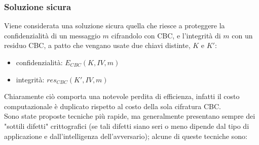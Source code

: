 \subsubsection{Soluzione sicura}
Viene considerata una soluzione sicura quella che riesce a proteggere la confidenzialità di un messaggio $m$ cifrandolo con CBC, e l'integrità di $m$ con un residuo CBC, a patto che vengano usate due chiavi distinte, $K$ e $K'$:
\begin{itemize}
\item confidenzialità: $E_{CBC}(K, IV, m)$
\item integrità: $res_{CBC}(K', IV, m)$
\end{itemize}
Chiaramente ciò comporta una notevole perdita di efficienza, infatti il costo computazionale è duplicato rispetto al
costo della sola cifratura CBC. \\
Sono state proposte tecniche più rapide, ma generalmente presentano sempre dei "sottili difetti" crittografici (se tali difetti siano seri o meno dipende dal tipo di applicazione e dall'intelligenza dell'avversario); alcune di queste tecniche sono:
